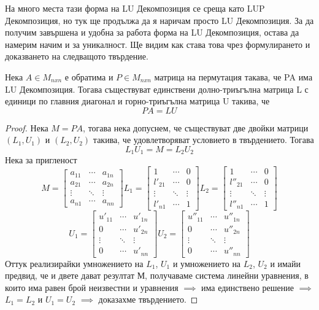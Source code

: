 \documentclass{article}
\begin{document}
На много места тази форма на LU Декомпозиция се среща като LUP Декомпозиция, но тук ще продължа да я наричам просто LU Декомпозиция. За да получим завършена и удобна за работа форма на LU Декомпозиция, остава да намерим начим и за уникалност. Ще видим как става това чрез формулирането и доказването на следващото твърдение.
\begin{theorem}
Нека $A\in M_{nxn}$ е обратима и $P\in M_{nxn}$ матрица на пермутация такава, че PA има LU Декомпозиция. Тогава съществуват единствени долно-триъгълна матрица L с единици по главния диагонал и горно-триъгълна матрица U такива, че \[PA = LU\]
\end{theorem}
\begin{proof}
Нека $M = PA$, тогава нека допуснем, че съществуват две двойки матрици $(L_{1}, U_{1})$ и $(L_{2}, U_{2})$ такива, че удовлетворяват условието в твърдението. Тогава \[L_{1}U_{1} = M = L_{2}U_{2}\] Нека за пригленост
\begin{equation*}
M = 
\begin{bmatrix}
a_{11} & \cdots & a_{1n} \\
a_{21} & \cdots & a_{2n} \\
\vdots  & \ddots & \vdots \\
a_{n1} & \cdots & a_{nn}
\end{bmatrix}
L_{1} = 
\begin{bmatrix}
1 & \cdots & 0 \\
l'_{21} & \cdots & 0 \\
\vdots  & \ddots & \vdots \\
l'_{n1} & \cdots & 1
\end{bmatrix}
L_{2} = 
\begin{bmatrix}
1 & \cdots & 0 \\
l''_{21} & \cdots & 0 \\
\vdots  & \ddots & \vdots \\
l''_{n1} & \cdots & 1
\end{bmatrix}
\end{equation*}
\begin{equation*}
U_{1} = 
\begin{bmatrix}
u'_{11} & \cdots & u'_{1n} \\
0 & \cdots & u'_{2n} \\
\vdots  & \ddots & \vdots \\
0 & \cdots & u'_{nn}
\end{bmatrix}
U_{2} = 
\begin{bmatrix}
u''_{11} & \cdots & u''_{1n} \\
0 & \cdots & u''_{2n} \\
\vdots  & \ddots & \vdots \\
0 & \cdots & u''_{nn}
\end{bmatrix}
\end{equation*}
Оттук реализирайки умножението на $L_{1}$, $U_{1}$ и умножението на $L_{2}$, $U_{2}$ и имайи предвид, че и двете дават резултат М, получаваме система линейни уравнения, в които има равен брой неизвестни и уравнения $\implies$ има единствено решение $\implies$ $L_{1} = L_{2}$ и $U_{1} = U_{2}$  $\implies$ доказахме твърдението.
\end{proof}
\end{document}
